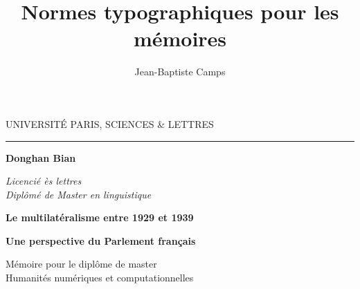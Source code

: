 \documentclass[a4paper,twoside,12pt]{book}
\title{Normes typographiques pour les mémoires}
\author{Jean-Baptiste Camps}
\begin{document}

\frontmatter

\begin{titlepage}
\begin{center}

\bigskip

\begin{large}
UNIVERSITÉ PARIS, SCIENCES \& LETTRES
\end{large}
\begin{center}\rule{2cm}{0.02cm}\end{center}

\bigskip
\bigskip
\bigskip
\begin{Large}
\textbf{Donghan Bian}\\
\end{Large}
\begin{normalsize} 
\textit{Licencié ès lettres}\\

\textit{Diplômé de Master en linguistique}\\

\end{normalsize}

\bigskip
\bigskip
\bigskip

\begin{Huge}
\textbf{
Le multilatéralisme entre 1929 et 1939}\\
\end{Huge}
\bigskip
\bigskip
\begin{LARGE}
\textbf{Une perspective du Parlement français}\\
\end{LARGE}

\bigskip
\bigskip
\bigskip
\begin{large}
\end{large}
\vfill

\begin{large}
Mémoire 
pour le diplôme
de master\\
\og Humanités numériques et computationnelles \fg{} \\
\end{large}

\end{center}
\end{titlepage}

\thispagestyle{empty}

\cleardoublepage
\end{document}

